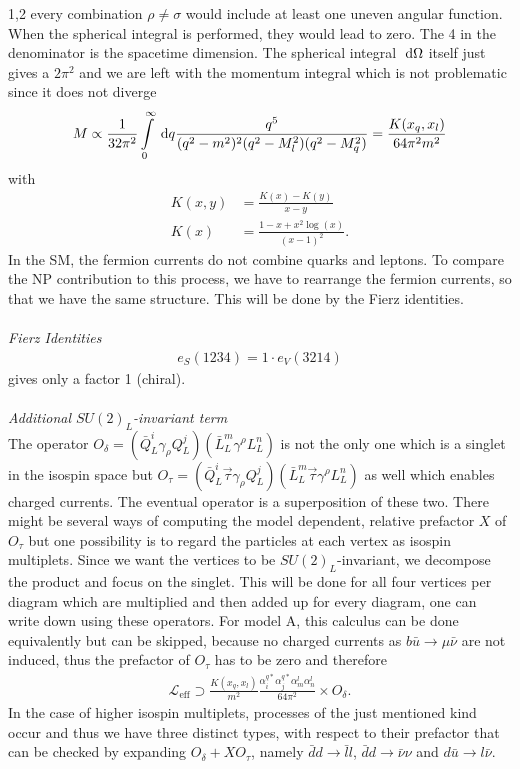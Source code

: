 \documentclass[11pt,a4paper,twoside]{article}
\numberwithin{equation}{section}
\begin{document}
\begin{spacing}{1,2}
every combination $\rho\neq\sigma$ would include at least one uneven angular function. When the spherical integral is performed, they would lead to zero. The 
4 in the denominator is the spacetime dimension. The spherical integral $\; \mathrm{d} \Omega$ itself just gives a $2\pi^2$ and we are left with the momentum integral
which is not problematic since it does not diverge
\begin{align}
 M \propto \frac{1}{32\pi^2} \int\limits_0^\infty \; \mathrm{d} q \frac{q^5}{(q^2-m^2)^2(q^2-M_l^2)(q^2-M_q^2)} = \frac{K(x_q,x_l)}{64\pi^2 m^2}
\end{align}
with
\begin{align}
 K(x,y) &= \frac{K(x)-K(y)}{x-y}\\
 K(x)&=\frac{1-x+x^2\log(x)}{(x-1)^2}.
\end{align}
In the SM, the fermion currents do not combine quarks and leptons. To compare the NP contribution to this process, we have to rearrange the fermion currents,
so that we have the same structure. This will be done by the Fierz identities.
\\ \\ \noindent \textit{Fierz Identities}\\
\cite{Fierz}
\begin{align}
 e_S(1234) = 1\cdot e_V(3214)
\end{align}
gives only a factor 1 (chiral).
\\ \\ \noindent \textit{Additional $SU(2)_L$-invariant term}\\
\noindent The operator $O_\delta=\left(\bar Q_L^i \gamma_\rho Q_L^j\right)\left(\bar L_L^m \gamma^\rho L_L^n\right)$ is not the only one which is a singlet
in the isospin space but $O_\tau=\left(\bar Q_L^i\vec \tau \gamma_\rho Q_L^j\right)\left(\bar L_L^m\vec \tau \gamma^\rho L_L^n\right)$ as well which enables
charged currents. The eventual operator is a superposition of these two. There might be several ways of computing the model dependent, relative 
prefactor $X$ of $O_\tau$  but one possibility is to regard the particles at each vertex as isospin multiplets. Since we want the vertices to be 
$SU(2)_L$-invariant, we 
decompose the product and focus on the singlet. This will be done for all four vertices per diagram which are multiplied and then added up for every diagram,
one can write down using these operators. For model A, this calculus can be done equivalently but can be skipped, because no charged currents as 
$b \bar u \rightarrow \mu \bar \nu$ are not induced, thus the prefactor of $O_\tau$ has to be zero and therefore 
\begin{align}
  \mathcal{L}_\text{eff} \supset \frac{K(x_q,x_l)}{m^2}\frac{\alpha_i^{q*} \alpha_j^{q*} \alpha_m^l \alpha_n^l}{64\pi^2} \times O_\delta.
 \label{eq_LagBSmumuModA}
\end{align}
In the case of higher isospin multiplets, processes of the just mentioned kind occur and thus we have three distinct types, with respect to their prefactor
that can be checked by expanding $O_\delta + X O_\tau$, namely $\bar d d\rightarrow \bar l l$, $\bar d d \rightarrow \bar\nu \nu$ and 
$d \bar u\rightarrow l\bar\nu$. 



\end{spacing}
\end{document}
